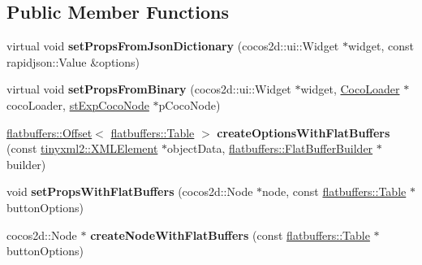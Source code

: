 \subsection*{Public Member Functions}
\begin{DoxyCompactItemize}
\item 
\mbox{\label{classcocostudio_1_1ButtonReader_a47c7500f22412e3e3a24e62c5c96110b}} 
virtual void {\bfseries set\+Props\+From\+Json\+Dictionary} (cocos2d\+::ui\+::\+Widget $\ast$widget, const rapidjson\+::\+Value \&options)
\item 
\mbox{\label{classcocostudio_1_1ButtonReader_aeca58e17c76c9312e3fcd246b7862cf9}} 
virtual void {\bfseries set\+Props\+From\+Binary} (cocos2d\+::ui\+::\+Widget $\ast$widget, \hyperlink{classcocostudio_1_1CocoLoader}{Coco\+Loader} $\ast$coco\+Loader, \hyperlink{structcocostudio_1_1stExpCocoNode}{st\+Exp\+Coco\+Node} $\ast$p\+Coco\+Node)
\item 
\mbox{\label{classcocostudio_1_1ButtonReader_ac88ca8b296ae78530e27b4a481ba4692}} 
\hyperlink{structflatbuffers_1_1Offset}{flatbuffers\+::\+Offset}$<$ \hyperlink{classflatbuffers_1_1Table}{flatbuffers\+::\+Table} $>$ {\bfseries create\+Options\+With\+Flat\+Buffers} (const \hyperlink{classtinyxml2_1_1XMLElement}{tinyxml2\+::\+X\+M\+L\+Element} $\ast$object\+Data, \hyperlink{classflatbuffers_1_1FlatBufferBuilder}{flatbuffers\+::\+Flat\+Buffer\+Builder} $\ast$builder)
\item 
\mbox{\label{classcocostudio_1_1ButtonReader_adde28f348dc906067cf72cb4537ccedc}} 
void {\bfseries set\+Props\+With\+Flat\+Buffers} (cocos2d\+::\+Node $\ast$node, const \hyperlink{classflatbuffers_1_1Table}{flatbuffers\+::\+Table} $\ast$button\+Options)
\item 
\mbox{\label{classcocostudio_1_1ButtonReader_ae10f70e3552f978626f67a85fffa4da0}} 
cocos2d\+::\+Node $\ast$ {\bfseries create\+Node\+With\+Flat\+Buffers} (const \hyperlink{classflatbuffers_1_1Table}{flatbuffers\+::\+Table} $\ast$button\+Options)
\item 
\mbox{\label{classcocostudio_1_1ButtonReader_a02a19e88efbba783745757dc306404aa}} 

\end{DoxyCompactItemize}
